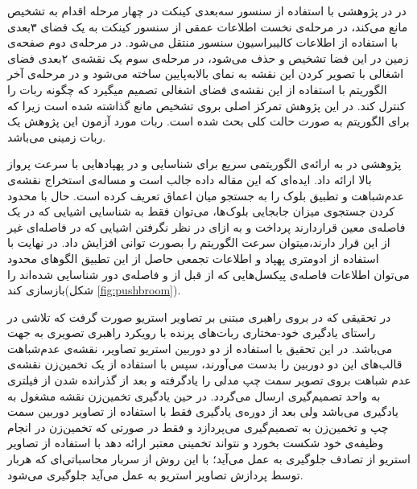 در  در پژوهشی با استفاده از سنسور سه‌بعدی کینکت در چهار مرحله اقدام به تشخیص مانع می‌کند، در مرحله‌ی نخست اطلاعات عمقی از سنسور کینکت به یک فضای ۳بعدی با استفاده از اطلاعات کالیبراسیون سنسور منتقل می‌شود. در مرحله‌ی دوم صفحه‌ی زمین در این فضا تشخیص و حذف می‌شود، در مرحله‌ی سوم یک نقشه‌ی ۲بعدی فضای اشغالی با تصویر کردن این نقشه به نمای بالابه‌پایین ساخته می‌شود و در مرحله‌ی آخر الگوریتم  با استفاده از این نقشه‌ی فضای اشغالی تصمیم میگیرد که چگونه ربات را کنترل کند. در این پژوهش تمرکز اصلی بروی تشخیص مانع گذاشته شده است زیرا که برای الگوریتم  به صورت حالت کلی بحث شده است. ربات مورد آزمون این پژوهش یک ربات زمینی می‌باشد.

پژوهشی در  به ارائه‌ی الگوریتمی سریع برای شناسایی و  در پهپادهایی با سرعت پرواز بالا ارائه داد. ایده‌ای که این مقاله داده جالب است و مساله‌ی استخراج نقشه‌ی عدم‌شباهت و تطبیق بلوک را به جستجو میان اعماق تعریف کرده است. حال با محدود کردن جستجوی میزان جابجایی بلوک‌ها، می‌توان فقط به شناسایی اشیایی که در یک فاصله‌ی معین قراردارند پرداخت و به ازای در نظر نگرفتن اشیایی که در فاصله‌ای غیر از این قرار دارند،میتوان سرعت الگوریتم را بصورت توانی افزایش داد. در نهایت با استفاده از ادومتری پهپاد و اطلاعات تجمعی حاصل از این تطبیق الگوهای محدود می‌توان اطلاعات فاصله‌ی پیکسل‌هایی که از قبل از و فاصله‌ی دور شناسایی شده‌اند را بازسازی کند(شکل \ref{fig:pushbroom}).





در تحقیقی که در  بروی راهبری مبتنی بر تصاویر استریو صورت گرفت که تلاشی در راستای یادگیری خود-مختاری ربات‌های پرنده با رویکرد راهبری تصویری به جهت  می‌باشد. در این تحقیق با استفاده از دو دوربین استریو تصاویر، نقشه‌ی عدم‌شباهت قالب‌های این دو دوربین را بدست می‌آورند، سپس با استفاده از یک تخمین‌زن نقشه‌ی عدم شباهت بروی تصویر سمت چپ مدلی را یادگرفته و بعد از گذرانده شدن از فیلتری به واحد تصمیم‌گیری ارسال می‌گردد. در حین یادگیری تخمین‌‌زن نقشه مشغول به یادگیری می‌باشد ولی بعد از دوره‌ی یادگیری فقط با استفاده از تصاویر دوربین سمت چپ و تخمین‌زن به تصمیم‌گیری می‌پردازد و فقط در صورتی که تخمین‌زن در انجام وظیفه‌ی خود شکست بخورد و نتواند تخمینی معتبر ارائه دهد با استفاده از تصاویر استریو از تصادف جلوگیری به عمل می‌آید؛ با این روش از سربار محاسباتی‌ای که هربار توسط پردازش تصاویر استریو به عمل می‌آید جلوگیری می‌شود.